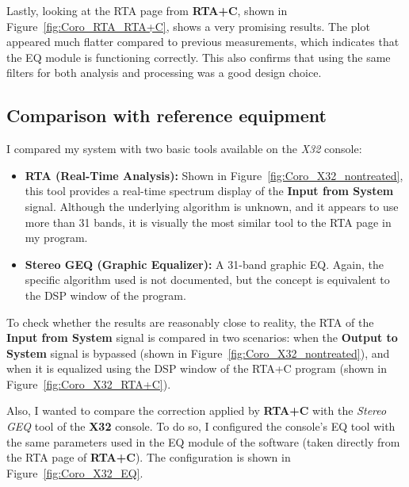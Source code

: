 Lastly, looking at the RTA  page from \textbf{RTA+C}, shown in Figure~\ref{fig:Coro_RTA_RTA+C}, shows a very promising results. The plot appeared much flatter compared to previous measurements, which indicates that the EQ module is functioning correctly. This also confirms that using the same filters for both analysis and processing was a good design choice.

\subsection{Comparison with reference equipment}

I compared my system with two basic tools available on the \textit{X32} console:

\begin{itemize}
	\item \textbf{RTA (Real-Time Analysis):} Shown in Figure~\ref{fig:Coro_X32_nontreated}, this tool provides a real-time spectrum display of the \textbf{Input from System} signal. Although the underlying algorithm is unknown, and it appears to use more than 31 bands, it is visually the most similar tool to the RTA page in my program.
	\item \textbf{Stereo GEQ (Graphic Equalizer):} A 31-band graphic EQ. Again, the specific algorithm used is not documented, but the concept is equivalent to the DSP window of the program.
\end{itemize}

To check whether the results are reasonably close to reality, the RTA of the \textbf{Input from System} signal is compared in two scenarios: when the \textbf{Output to System} signal is bypassed (shown in Figure~\ref{fig:Coro_X32_nontreated}), and when it is equalized using the DSP window of the RTA+C program (shown in Figure~\ref{fig:Coro_X32_RTA+C}).

Also, I wanted to compare the correction applied by \textbf{RTA+C} with the \textit{Stereo GEQ} tool of the \textbf{X32} console. To do so, I configured the console's EQ tool with the same parameters used in the EQ module of the software (taken directly from the RTA page of \textbf{RTA+C}). The configuration is shown in Figure~\ref{fig:Coro_X32_EQ}.

